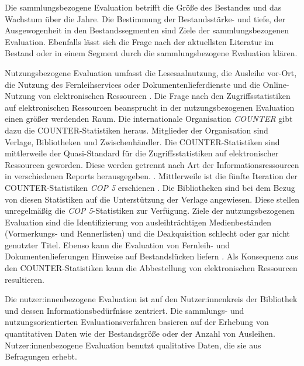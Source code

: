Die sammlungsbezogene Evaluation betrifft die Größe des Bestandes und das Wachstum über die Jahre. Die Bestimmung der Bestandsstärke- und tiefe, 
der Ausgewogenheit in den Bestandssegmenten sind Ziele der sammlungsbezogenen Evaluation. 
Ebenfalls lässt sich die Frage nach der aktuellsten Literatur im Bestand oder in einem Segment durch die sammlungsbezogene Evaluation klären.

Nutzungsbezogene Evaluation umfasst die Lesesaalnutzung, die Ausleihe vor-Ort, die Nutzung des Fernleihservices oder Dokumentenlieferdienste und die Online-Nutzung von elektronischen Ressourcen \cite[vgl.][254 ff.]{johannsen_jochen_bestands-_2015}.
Die Frage nach den Zugriffsstatistiken auf elektronischen Ressourcen beansprucht in der nutzungsbezogenen Evaluation einen größer werdenden Raum.
Die internationale Organisation \textit{\acrfull{COUNTER}} gibt dazu die COUNTER-Statistiken heraus. Mitglieder der Organisation sind Verlage, Bibliotheken
und Zwischenhändler. Die COUNTER-Statistiken sind mittlerweile der Quasi-Standard für die Zugriffsstatistiken 
auf elektronischer Ressourcen geworden. Diese werden getrennt nach Art der Informationsressourcen in verschiedenen Reports herausgegeben. \cite[vgl.][260 ff.]{johannsen_jochen_bestands-_2015}. 
Mittlerweile ist die fünfte Iteration der COUNTER-Statistiken \textit{\acrshort{COP 5}} erschienen \cite[vgl.][]{counter_abstract_2020}.
Die Bibliotheken sind bei dem Bezug von diesen Statistiken auf die Unterstützung der Verlage angewiesen. Diese stellen unregelmäßig die \textit{\acrshort{COP 5}}-Statistiken zur
Verfügung. Ziele der nutzungsbezogenen Evaluation sind die Identifizierung von ausleihträchtigen Medienbeständen (Vormerkungs- und Rennerlisten) und
die Deakquisition schlecht oder gar nicht genutzter Titel. Ebenso kann die Evaluation von Fernleih- und Dokumentenlieferungen Hinweise auf Bestandslücken liefern
\cite[vgl.][255 ff.]{johannsen_jochen_bestands-_2015}. Als Konsequenz aus den COUNTER-Statistiken kann die Abbestellung von elektronischen Ressourcen resultieren.

Die nutzer:innenbezogene Evaluation ist auf den Nutzer:innenkreis der Bibliothek und dessen Informationsbedürfnisse zentriert. 
Die sammlungs- und nutzungsorientierten Evaluationsverfahren basieren auf der Erhebung von quantitativen Daten wie der Bestandsgröße oder der Anzahl von Ausleihen. 
Nutzer:innenbezogene Evaluation benutzt qualitative Daten, die sie aus Befragungen erhebt.

